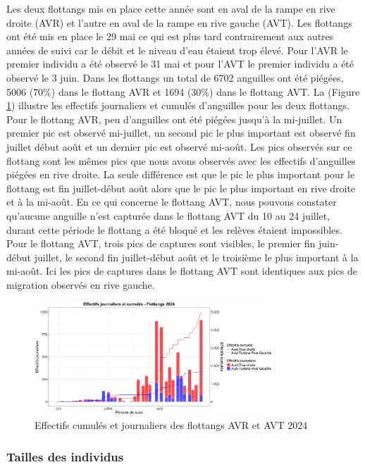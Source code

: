 \documentclass[11pt,titlepage,twoside]{article}\usepackage[]{graphicx}\usepackage[table]{xcolor}
\begin{document}
Les deux flottangs mis en place cette année sont en aval de la rampe en rive droite (AVR) et l’autre en aval de la rampe en rive gauche (AVT). Les flottangs ont été mis en place le 29 mai ce qui est plus tard contrairement aux autres années de suivi car le débit et le niveau d’eau étaient trop élevé. Pour l’AVR le premier individu a été observé le 31 mai et pour l’AVT le premier individu a été observé le 3 juin. Dans les flottangs un total de 6702 anguilles ont été piégées, 5006 (70\%) dans le flottang AVR et 1694 (30\%) dans le flottang AVT. La (Figure \ref{graph_flottang_oral}) illustre les effectifs journaliers et cumulés d'anguilles pour les deux flottangs. Pour le flottang AVR, peu d’anguilles ont été piégées jusqu’à la mi-juillet. Un premier pic est observé mi-juillet, un second pic le plus important est observé fin juillet début août et un dernier pic est observé mi-août. Les pics observés sur ce flottang sont les mêmes pics que nous avons observés avec les effectifs d’anguilles piégées en rive droite. La seule différence est que le pic le plus important pour le flottang est fin juillet-début août alors que le pic le plus important en rive droite et à la mi-août. En ce qui concerne le flottang AVT, nous pouvons constater qu’aucune anguille n’est capturée dans le flottang AVT du 10 au 24 juillet, durant cette période le flottang a été bloqué et les relèves étaient impossibles. Pour le flottang AVT, trois pics de captures sont visibles, le premier fin juin-début juillet, le second fin juillet-début août et le troisième le plus important à la mi-août. Ici les pics de captures dans le flottang AVT sont identiques aux pics de migration observés en rive gauche.


\begin{figure}[htpb]
\centering
\includegraphics[width=0.8\textwidth]{graph_flottang_oral.png}
\caption{Effectifs cumulés et journaliers des flottangs AVR et AVT 2024}
\label{graph_flottang_oral}
\end{figure} 

\subsubsection{Tailles des individus}
\end{document}
